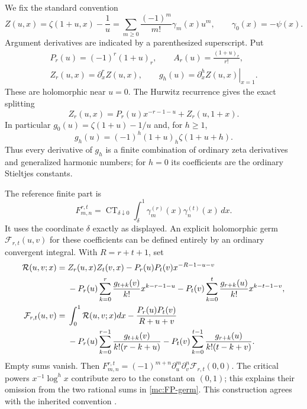 \documentclass[11pt,a4paper]{article}
\numberwithin{equation}{section}
\theoremstyle{definition}
\theoremstyle{remark}
\begin{document}
We fix the standard convention
\begin{equation}\label{mc:stieltjes}
 Z(u,x)=\zeta(1+u,x)-\frac1u
     =\sum_{m\ge0}\frac{(-1)^m}{m!}\gamma_m(x)u^m,
 \qquad \gamma_0(x)=-\psi(x).
\end{equation}
Argument derivatives are indicated by a parenthesized superscript.
Put
\begin{equation}\label{mc:notation}
 \begin{gathered}
 P_r(u)=(-1)^r(1+u)_r,\qquad
 A_r(u)=\frac{(1+u)_r}{r!},\\
 Z_r(u,x)=\partial_x^r Z(u,x),\qquad
 g_h(u)=\left.\partial_x^h Z(u,x)\right|_{x=1}.
 \end{gathered}
\end{equation}
These are holomorphic near $u=0$. The Hurwitz recurrence
\cite[\S25.11]{DLMF} gives the exact splitting
\begin{equation}\label{mc:split}
       Z_r(u,x)=P_r(u)x^{-r-1-u}+Z_r(u,1+x).
\end{equation}
In particular $g_0(u)=\zeta(1+u)-1/u$ and, for $h\ge1$,
\begin{equation}\label{mc:g-explicit}
        g_h(u)=(-1)^h(1+u)_h\zeta(1+u+h).
\end{equation}
Thus every derivative of $g_h$ is a finite combination of
ordinary zeta derivatives and generalized harmonic numbers;
for $h=0$ its coefficients are the ordinary Stieltjes constants.

The reference finite part is
\begin{equation}\label{mc:FP}
 F_{m,n}^{r,t}=\operatorname{CT}_{\delta\downarrow0}
  \int_\delta^1\gamma_m^{(r)}(x)\gamma_n^{(t)}(x)\,dx.
\end{equation}
It uses the coordinate $\delta$ exactly as displayed. An explicit
holomorphic germ $\mathcal F_{r,t}(u,v)$ for these coefficients
can be defined entirely by an ordinary convergent integral.
With $R=r+t+1$, set
\begin{align}\label{mc:FP-remainder}
 \mathcal R(u,v;x)={}&Z_r(u,x)Z_t(v,x)
       -P_r(u)P_t(v)x^{-R-1-u-v}\notag\\
 &-P_r(u)\sum_{k=0}^r\frac{g_{t+k}(v)}{k!}x^{k-r-1-u}
  -P_t(v)\sum_{k=0}^t\frac{g_{r+k}(u)}{k!}x^{k-t-1-v},\\
 \mathcal F_{r,t}(u,v)={}&\int_0^1\mathcal R(u,v;x)dx
  -\frac{P_r(u)P_t(v)}{R+u+v}\notag\\
 &-P_r(u)\sum_{k=0}^{r-1}\frac{g_{t+k}(v)}{k!(r-k+u)}
  -P_t(v)\sum_{k=0}^{t-1}\frac{g_{r+k}(u)}{k!(t-k+v)}.
 \label{mc:FP-germ}
\end{align}
Empty sums vanish. Then
$F_{m,n}^{r,t}=(-1)^{m+n}\partial_u^m\partial_v^n
\mathcal F_{r,t}(0,0)$.
The critical powers $x^{-1}\log^h x$ contribute zero to the
constant on $(0,1)$; this explains their omission from the two
rational sums in \eqref{mc:FP-germ}. This construction agrees with
the inherited convention \cite{GapSix,LatticeIncoming}.
\end{document}
